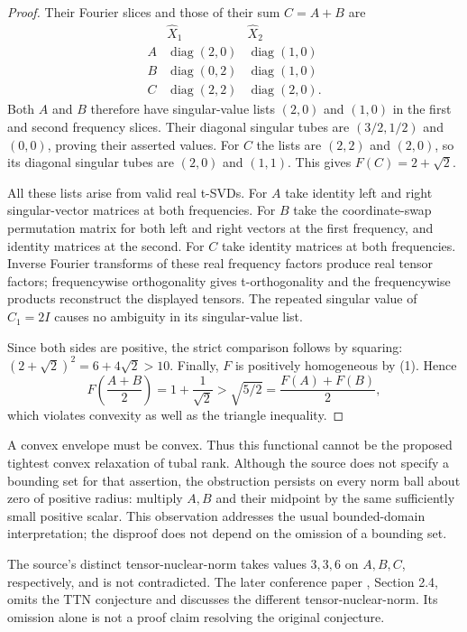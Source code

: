 \documentclass[11pt]{article}
\newcommand{\diag}{\operatorname{diag}}
\begin{document}
\begin{proof}
Their Fourier slices and those of their sum $C=A+B$ are
\[
\begin{array}{c|cc}
 &\widehat X_1&\widehat X_2\\ \hline
 A&\diag(2,0)&\diag(1,0)\\
 B&\diag(0,2)&\diag(1,0)\\
 C&\diag(2,2)&\diag(2,0).
\end{array}
\]
Both $A$ and $B$ therefore have singular-value lists $(2,0)$ and
$(1,0)$ in the first and second frequency slices. Their diagonal
singular tubes are $(3/2,1/2)$ and $(0,0)$, proving their asserted values.
For $C$ the lists are $(2,2)$ and $(2,0)$, so its diagonal singular
tubes are $(2,0)$ and $(1,1)$. This gives $F(C)=2+\sqrt2$.

All these lists arise from valid real t-SVDs. For $A$ take identity
left and right singular-vector matrices at both frequencies. For $B$
take the coordinate-swap permutation matrix for both left and right
vectors at the first frequency, and identity matrices at the second.
For $C$ take identity matrices at both frequencies. Inverse Fourier
transforms of these real frequency factors produce real tensor
factors; frequencywise orthogonality gives t-orthogonality and the
frequencywise products reconstruct the displayed tensors. The repeated
singular value of $\widehat C_1=2I$ causes no ambiguity in its
singular-value list.

Since both sides are positive, the strict comparison follows by squaring:
$(2+\sqrt2)^2=6+4\sqrt2>10$. Finally, $F$ is positively homogeneous
by (1). Hence
\[
 F\left(\frac{A+B}{2}\right)
 =1+\frac1{\sqrt2}>\sqrt{5/2}
 =\frac{F(A)+F(B)}2,
\]
which violates convexity as well as the triangle inequality.
\end{proof}

A convex envelope must be convex. Thus this functional cannot be the
proposed tightest convex relaxation of tubal rank. Although the source
does not specify a bounding set for that assertion, the obstruction
persists on every norm ball about zero of positive radius: multiply
$A,B$ and their midpoint by the same sufficiently small positive scalar.
This observation addresses the usual bounded-domain interpretation;
the disproof does not depend on the omission of a bounding set.

The source's distinct tensor-nuclear-norm takes values $3,3,6$ on
$A,B,C$, respectively, and is not contradicted. The later conference
paper \cite{conference}, Section 2.4, omits the TTN conjecture and
discusses the different tensor-nuclear-norm. Its omission alone is
not a proof claim resolving the original conjecture.
\end{document}
